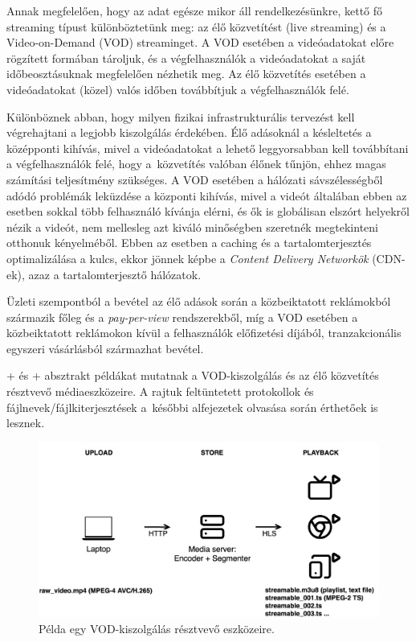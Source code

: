 Annak megfelelően, hogy az adat egésze mikor áll rendelkezésünkre, kettő fő streaming típust különböztetünk meg: az élő közvetítést (live streaming) és a Video-on-Demand (VOD) streaminget. A VOD esetében a videóadatokat előre rögzített formában tároljuk, és a végfelhasználók a videóadatokat a saját időbeosztásuknak megfelelően nézhetik meg. Az élő közvetítés esetében a videóadatokat (közel) valós időben továbbítjuk a végfelhasználók felé.

Különböznek abban, hogy milyen fizikai infrastrukturális tervezést kell végrehajtani a legjobb kiszolgálás érdekében. Élő adásoknál a késleltetés a középponti kihívás, mivel a videóadatokat a lehető leggyorsabban kell továbbítani a végfelhasználók felé, hogy a~közvetítés valóban élőnek tűnjön, ehhez magas számítási teljesítmény szükséges. A VOD esetében a hálózati sávszélességből adódó problémák leküzdése a központi kihívás, mivel a videót általában ebben az esetben sokkal több felhasználó kívánja elérni, és ők is globálisan elszórt helyekről nézik a videót, nem mellesleg azt kiváló minőségben szeretnék megtekinteni otthonuk kényelméből. Ebben az esetben a caching és a tartalomterjesztés optimalizálása a kulcs, ekkor jönnek képbe a \emph{Content Delivery Networkök} (CDN-ek), azaz a tartalomterjesztő hálózatok.\cite{cdn}

Üzleti szempontból a bevétel az élő adások során a közbeiktatott reklámokból származik főleg és a \emph{pay-per-view} rendszerekből, míg a VOD esetében a közbeiktatott reklámokon kívül a felhasználók előfizetési díjából, tranzakcionális egyszeri vásárlásból származhat bevétel.

\Az+ és \az+ absztrakt példákat mutatnak a VOD-kiszolgálás és az élő közvetítés résztvevő médiaeszközeire. A rajtuk feltüntetett protokollok és fájlnevek/fájlkiterjesztések a~későbbi alfejezetek olvasása során érthetőek is lesznek.

\begin{figure}[h]
	\centering
	\includegraphics[width=120mm, keepaspectratio]{figures/dipterv_vodsetup.png}
	\caption{Példa egy VOD-kiszolgálás résztvevő eszközeire.}
	\label{fig:vodsetup}
\end{figure}

